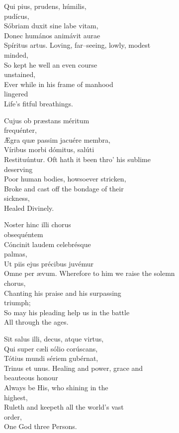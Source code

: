 

\medskip

Qui pius, prudens, húmilis,\\ 
\phantom{tab} pudícus,\\
Sóbriam duxit sine labe
vitam,\\
Donec humános animávit
aurae\\
Spíritus artus.
\divverse
Loving, far–seeing, lowly, modest\\
\phantom{tab} minded,\\
So kept he well an even course\\
\phantom{tab} unstained,\\
Ever while in his frame of manhood\\
\phantom{tab} lingered\\
Life’s fitful breathings.
\finishverse


Cujus ob præstans méritum\\ \phantom{tab} frequénter,\\
Ægra quæ passim jacuére
membra,\\
Víribus morbi dómitus, salúti \\
Restituúntur.
\divverse
Oft hath it been thro’ his sublime\\
\phantom{tab} deserving\\
Poor human bodies, howsoever
stricken,\\
Broke and cast off the bondage of their\\
\phantom{tab} sickness,\\
Healed Divinely.
\finishverse


Noster hinc illi chorus\\
\phantom{tab} obsequéntem\\
Cóncinit laudem celebrésque\\
\phantom{tab} palmas,\\
Ut piis ejus précibus juvémur\\
Omne per ævum.
\divverse
Wherefore to him we raise the solemn\\
\phantom{tab} chorus,\\
Chanting his praise and his surpassing\\
\phantom{tab} triumph;\\
So may his pleading help us in the
battle\\
All through the ages.
\finishverse


Sit salus illi, decus, atque
virtus,\\
Qui super cæli sólio
corúscans,\\
Tótius mundi sériem
gubérnat,\\
Trinus et unus.
\divverse
Healing and power, grace and\\
\phantom{tab} beauteous honour\\
Always be His, who shining in the\\
\phantom{tab} highest,\\
Ruleth and keepeth all the world’s vast\\
\phantom{tab} order,\\
One God three Persons.
\finishverse

\medskip



